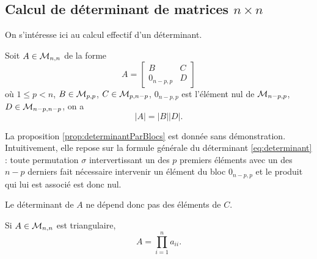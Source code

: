 \subsection{Calcul de déterminant de matrices $n \times n$} 

On s'intéresse ici au calcul effectif d'un déterminant.

\begin{proposition} \label{prop:determinantParBlocs}
  Soit $A \in \mathcal{M}_{n,n}$ de la forme
  $$
  A = \left[\begin{array}{cc}
      B & C \\ 0_{n-p, p} & D
    \end{array}\right]
  $$
  où $1 \leq p < n$, $B \in \mathcal{M}_{p, p}$, $C \in \mathcal{M}_{p, n-p}$, $0_{n-p, p}$ est l'élément nul de $\mathcal{M}_{n-p, p}$, $D \in \mathcal{M}_{n-p, n-p}$, on a
  $$
  |A| = |B| |D|.
  $$
\end{proposition}

La proposition \ref{prop:determinantParBlocs} est donnée sans démonstration. Intuitivement, elle repose sur la formule générale du déterminant \eqref{eq:determinant} : toute permutation $\sigma$ intervertissant un des $p$ premiers éléments avec un des $n-p$ derniers fait nécessaire intervenir un élément du bloc $0_{n-p, p}$ et le produit qui lui est associé est donc nul.
\eproof

\remark Le déterminant de $A$ ne dépend donc pas des éléments de $C$.

\begin{proposition} \label{prop:determinantMatriceTriangulaire}
  Si $A \in \mathcal{M}_{n,n}$ est triangulaire, 
  $$
  A = \prod_{i=1}^n a_{ii}.
  $$
\end{proposition}


